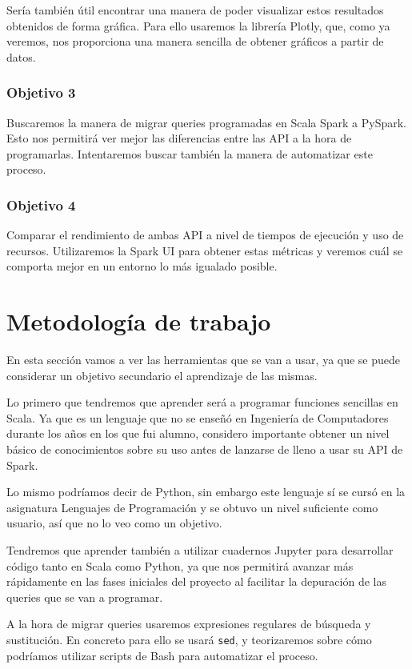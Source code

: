 \documentclass[12pt,twoside,titlepage]{report}
\begin{document}
Sería también útil encontrar una manera de poder visualizar estos resultados obtenidos de forma gráfica. Para ello usaremos la librería Plotly, que, como ya veremos, nos proporciona una manera sencilla de obtener gráficos a partir de datos.

\subsubsection{Objetivo 3}

Buscaremos la manera de migrar queries programadas en Scala Spark a PySpark. Esto nos permitirá ver mejor las diferencias entre las API a la hora de programarlas. Intentaremos buscar también la manera de automatizar este proceso.

\subsubsection{Objetivo 4}

Comparar el rendimiento de ambas API a nivel de tiempos de ejecución y uso de recursos. Utilizaremos la Spark UI para obtener estas métricas y veremos cuál se comporta mejor en un entorno lo más igualado posible.


\section{Metodología de trabajo}

En esta sección vamos a ver las herramientas que se van a usar, ya que se puede considerar un objetivo secundario el aprendizaje de las mismas.

Lo primero que tendremos que aprender será a programar funciones sencillas en Scala. Ya que es un lenguaje que no se enseñó en Ingeniería de Computadores durante los años en los que fui alumno, considero importante obtener un nivel básico de conocimientos sobre su uso antes de lanzarse de lleno a usar su API de Spark.

Lo mismo podríamos decir de Python, sin embargo este lenguaje sí se cursó en la asignatura Lenguajes de Programación y se obtuvo un nivel suficiente como usuario, así que no lo veo como un objetivo.

Tendremos que aprender también a utilizar cuadernos Jupyter para desarrollar código tanto en Scala como Python, ya que nos permitirá avanzar más rápidamente en las fases iniciales del proyecto al facilitar la depuración de las queries que se van a programar.

A la hora de migrar queries usaremos expresiones regulares de búsqueda y sustitución. En concreto para ello se usará \texttt{sed}, y teorizaremos sobre cómo podríamos utilizar scripts de Bash para automatizar el proceso.
\end{document}
